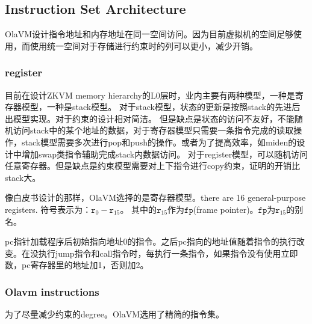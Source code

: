 \subsection{Instruction Set Architecture}\label{subsec: processor-instructions-executor}
OlaVM设计指令地址和内存地址在同一空间访问。因为目前虚拟机的空间足够使用，而使用统一空间对于存储进行约束时的列可以更小，减少开销。

\subsubsection{register}\label{subsec: processor-register}
目前在设计ZKVM memory hierarchy的L0层时，业内主要有两种模型，一种是寄存器模型，一种是stack模型。
对于stack模型，状态的更新是按照stack的先进后出模型实现。对于约束的设计相对简洁。
但是缺点是状态的访问不友好，不能随机访问stack中的某个地址的数据，对于寄存器模型只需要一条指令完成的读取操作，stack模型需要多次进行pop和push的操作。或者为了提高效率，如miden的设计中增加swap类指令辅助完成stack内数据访问。
对于register模型，可以随机访问任意寄存器。但是缺点是约束模型需要对上下指令进行copy约束，证明的开销比stack大。

像白皮书设计的那样，OlaVM选择的是寄存器模型。there are 16 general-purpose registers.
符号表示为：$\texttt{r}_0 - \texttt{r}_{15}$。
其中的$\texttt{r}_{15}$作为$\texttt{fp}$(frame pointer)。$\texttt{fp}$为$\texttt{r}_{15}$的别名。

pc指针加载程序后初始指向地址0的指令。之后pc指向的地址值随着指令的执行改变。在没执行jump指令和call指令时，每执行一条指令，如果指令没有使用立即数，pc寄存器里的地址加1，否则加2。

\subsubsection{Olavm instructions}\label{subsec: processor-instructions-executor-instructions}
为了尽量减少约束的degree。OlaVM选用了精简的指令集。

